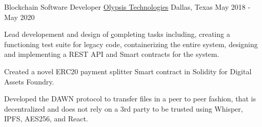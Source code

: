 \begin{cventries}
	\cventry
	{Blockchain Software Developer}
	{\href{https://www.olypsis.com/}{Olypsis Technologies}}
	{Dallas, Texas} %
	{May 2018 - May 2020} %
	{
		\begin{cvitems} %
			\item {Lead developement and design of \href{https://blocknkey.com/}
			            completing tasks including, creating a functioning test
			            suite for legacy code, containerizing the entire system,
			            designing and implementing a REST API and Smart contracts
			            for the system.
			      }
			\item {Created a novel ERC20 payment splitter Smart contract in Solidity for Digital Assets
			            Foundry.}
			\item {Developed the DAWN protocol to transfer files in a peer to
			            peer fashion, that is decentralized and does not rely on a
			            3rd party to be trusted using Whisper, IPFS, AES256, and React.}
		\end{cvitems}
	}




\end{cventries}

